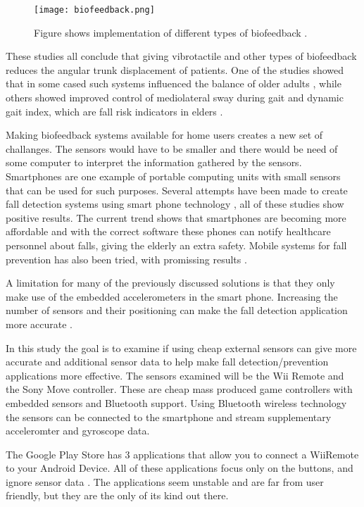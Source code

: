 \begin{figure}[h!]
  \centering
    \texttt{[image: biofeedback.png]}
    \caption{\footnotesize Figure shows implementation of different types of biofeedback \cite{multiModualBiofeedback}. }
\end{figure}

These studies all conclude that giving vibrotactile and other types of biofeedback reduces the angular trunk displacement of patients. One of the studies showed that in some cased such systems influenced the balance of older adults \cite{mutliModualbiofeedback}, while others showed improved control of mediolateral sway during gait and dynamic gait index, which are fall risk indicators in elders \cite{vibrotactileTiltFeedback}.

Making biofeedback systems available for home users creates a new set of challanges. The sensors would have to be smaller and there would be need of some computer to interpret the information gathered by the sensors. Smartphones are one example of portable computing units with small sensors that can be used for such purposes. Several attempts have been made to create fall detection systems using smart phone technology \cite{iFall, semiSupervisedFallDetection, mobilePhoneBasedFallDetection, detectionOfFalls}, all of these studies show positive results. The current trend shows that smartphones are becoming more affordable \cite{find_some_data_here} and with the correct software these phones can notify healthcare personnel about falls, giving the elderly an extra safety. Mobile systems for fall prevention has also been tried, with promissing results \cite{fallPrevention}.

A limitation for many of the previously discussed solutions is that they only make use of the embedded accelerometers in the smart phone. Increasing the number of sensors and their positioning can make the fall detection application more accurate \cite{fallDetectionWithExtraSensors}. 

In this study the goal is to examine if using cheap external sensors can give more accurate and additional sensor data to help make fall detection/prevention applications more effective. The sensors examined will be the Wii Remote and the Sony Move controller. These are cheap mass produced game controllers with embedded sensors and Bluetooth support. Using Bluetooth wireless technology the sensors can be connected to the smartphone and stream supplementary acceleromter and gyroscope data.

The Google Play Store has 3 applications that allow you to connect a WiiRemote to your Android Device. All of these applications focus only on the buttons, and ignore sensor data \cite{wiimoteController, simpleWiiController}. The applications seem unstable and are far from user friendly, but they are the only of its kind out there.

